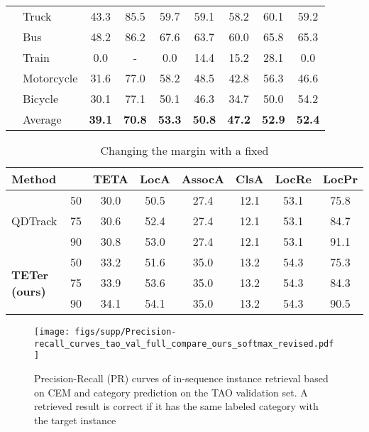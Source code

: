 \documentclass[runningheads]{llncs}
\begin{document}
\begin{table*}[t]
{\begin{tabular}{@{}l|l|ccc|cccc@{}}
&Truck &43.3 &85.5 &59.7 &59.1 &58.2 &60.1 &59.2 \\
&Bus &48.2 &86.2 &67.6 &63.7 &60.0 &65.8 &65.3 \\
&Train &0.0 &- &0.0 &14.4 &15.2 &28.1 &0.0 \\
&Motorcycle &31.6 &77.0 &58.2 &48.5 &42.8 &56.3 &46.6 \\
&Bicycle &30.1 &77.1 &50.1 &46.3 &34.7 &50.0 &54.2 \\
\cline{2-9} 
 & Average & \textbf{39.1} & \textbf{70.8} & \textbf{53.3} & \textbf{50.8} & \textbf{47.2} & \textbf{52.9} & \textbf{52.4} \\ \bottomrule
\end{tabular}}
\end{table*}


\begin{table}[t]
\centering
\caption{Changing the margin  with a fixed }
\begin{tabular}{@{}l|c|cccccc@{}}

\hline
Method                         &   & TETA   & LocA   & AssocA & ClsA & LocRe & LocPr    \\ \hline
\multirow{3}{*}{QDTrack}       & 50 & 30.0 & 50.5 & 27.4 & 12.1 & 53.1 & 75.8 \\
                               & 75 & 30.6 & 52.4 & 27.4 & 12.1 & 53.1 & 84.7 \\
                              & 90 & 30.8 & 53.0 & 27.4 & 12.1 & 53.1 & 91.1 \\ \hline
\multirow{3}{*}{\textbf{TETer (ours)}}  & 50 & 33.2 & 51.6 & 35.0 & 13.2 & 54.3 & 75.3 \\
                              & 75 & 33.9 & 53.6 & 35.0 & 13.2 & 54.3 & 84.3\\
                              & 90 & 34.1 & 54.1 & 35.0 & 13.2 & 54.3 & 90.5\\ \hline
\end{tabular}
\label{tab:fixa}
\end{table}


\begin{figure}[t]
	\centering
\texttt{[image: figs/supp/Precision-recall\_curves\_tao\_val\_full\_compare\_ours\_softmax\_revised.pdf]}
	\caption{Precision-Recall (PR) curves of in-sequence instance retrieval based on CEM and category prediction on the TAO validation set. A retrieved result is correct if it has the same labeled category with the target instance }
	\label{fig:PR_TAO_FULL}
\end{figure}
\end{document}
